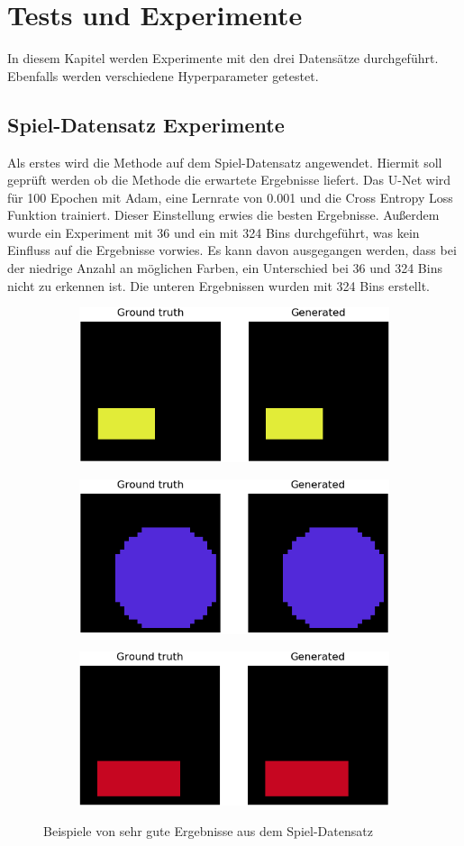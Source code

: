\chapter{Tests und Experimente}
In diesem Kapitel werden Experimente mit den drei Datensätze durchgeführt. Ebenfalls werden verschiedene Hyperparameter getestet.

\section{Spiel-Datensatz Experimente}
Als erstes wird die Methode auf dem Spiel-Datensatz angewendet. Hiermit soll geprüft werden ob die Methode die erwartete
Ergebnisse liefert. Das U-Net wird für 100 Epochen mit Adam, eine Lernrate von 0.001 und die Cross Entropy Loss Funktion trainiert. Dieser
Einstellung erwies die besten Ergebnisse. Außerdem wurde ein Experiment mit 36 und ein mit 324 Bins durchgeführt, was kein Einfluss auf die 
Ergebnisse vorwies. Es kann davon ausgegangen werden, dass bei der niedrige Anzahl an möglichen Farben, ein Unterschied bei 36 und 324 Bins
nicht zu erkennen ist. Die unteren Ergebnissen wurden mit 324 Bins erstellt.

\begin{figure}[H]
  \vspace{1cm}
  \begin{subfigure}
    \centering
    \includegraphics[width=.32\textwidth]{resources/experiments/30.png}
  \end{subfigure}
  \begin{subfigure}
    \centering
    \includegraphics[width=.32\textwidth]{resources/experiments/31.png}
  \end{subfigure}
  \begin{subfigure}
    \centering
    \includegraphics[width=.32\textwidth]{resources/experiments/42.png}
  \end{subfigure}
  \caption{Beispiele von sehr gute Ergebnisse aus dem Spiel-Datensatz}
  \label{image:gute-ergebnisse-toy-dataset}
\end{figure}

